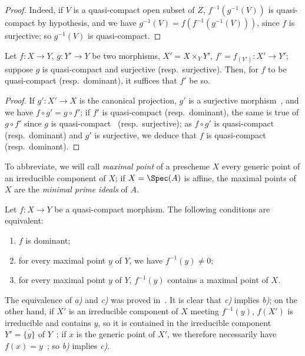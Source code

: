 \begin{proof}
Indeed, if $V$ is a quasi-compact open subset of $Z$, $f^{-1}(g^{-1}(V))$ is quasi-compact
by hypothesis, and we have $g^{-1}(V)=f(f^{-1}(g^{-1}(V)))$, since $f$ is surjective; so $g^{-1}(V)$
is quasi-compact.
\end{proof}

\begin{corollary}[1.1.4]
\label{IV.1.1.4}
Let $f:X\to Y$, $g:Y'\to Y$ be two morphisms, $X'=X\times_Y Y'$,
$f'=f_{(Y')}:X'\to Y'$; suppose $g$ is quasi-compact and surjective \textnormal{(}resp.\ surjective\textnormal{)}. Then, for $f$ to be
quasi-compact \textnormal{(}resp.\ dominant\textnormal{)}, it suffices that $f'$ be so.
\end{corollary}

\begin{proof}
If $g':X'\to X$ is the canonical projection, $g'$ is a surjective morphism~,
and we have $f\circ g'=g\circ f'$; if $f'$ is quasi-compact (resp.\ dominant), the same is true of $g\circ f'$
since $g$ is quasi-compact~ (resp.\ surjective); as $f\circ g'$ is quasi-compact
(resp.\ dominant) and $g'$ is surjective, we deduce that $f$ is quasi-compact~
(resp.\ dominant).
\end{proof}


To abbreviate, we will call \emph{maximal point} of a prescheme $X$ every generic point
of an irreducible component of $X$; if $X=\Spec(A)$ is affine, the maximal points
of $X$ are the \emph{minimal prime ideals} of $A$.

\begin{proposition}[1.1.5]
\label{IV.1.1.5}
Let $f:X\to Y$ be a quasi-compact morphism. The following
conditions are equivalent:
\begin{enumerate}[label=\emph{\alph*)}]
  \item $f$ is dominant;
  \item for every maximal point $y$ of $Y$, we have $f^{-1}(y)\neq 0$;
  \item for every maximal point $y$ of $Y$, $f^{-1}(y)$ contains a maximal point of $X$.
\end{enumerate}
\end{proposition}

The equivalence of \emph{a)} and \emph{c)} was proved in~. It is clear that \emph{c)}
implies \emph{b)}; on the other hand, if $X'$ is an irreducible component of $X$ meeting $f^{-1}(y)$,
$f(X')$ is irreducible and contains $y$, so it is contained in the irreducible component
$Y'=\overline{\{y\}}$ of $Y$~; if $x$ is the generic point of $X'$, we therefore necessarily have
$f(x)=y$~; so \emph{b)} implies \emph{c)}.

